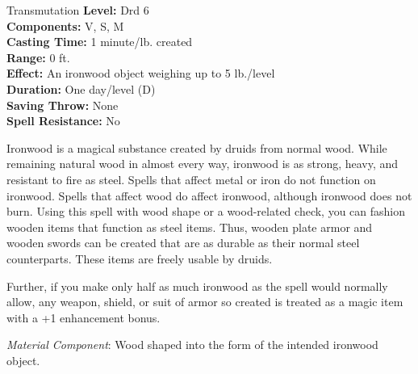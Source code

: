 {Transmutation}
{
	\textbf{Level:}
	Drd 6\\
	\textbf{Components:}
	V, S, M\\
	\textbf{Casting Time:}
	1 minute/lb. created\\
	\textbf{Range:}
	0 ft.\\
	\textbf{Effect:}
	An ironwood object weighing up to 5 lb./level\\
	\textbf{Duration:}
	One day/level (D)\\
	\textbf{Saving Throw:}
	None\\
	\textbf{Spell Resistance:}
	No\\
}
{
	Ironwood is a magical substance created by druids from normal wood. While remaining natural wood in almost every way, ironwood is as strong, heavy, and resistant to fire as steel. Spells that affect metal or iron do not function on ironwood. Spells that affect wood do affect ironwood, although ironwood does not burn. Using this spell with wood shape or a wood-related  check, you can fashion wooden items that function as steel items. Thus, wooden plate armor and wooden swords can be created that are as durable as their normal steel counterparts. These items are freely usable by druids.

	Further, if you make only half as much ironwood as the spell would normally allow, any weapon, shield, or suit of armor so created is treated as a magic item with a +1 enhancement bonus.

	\textit{Material Component}:
	Wood shaped into the form of the intended ironwood object.

}

